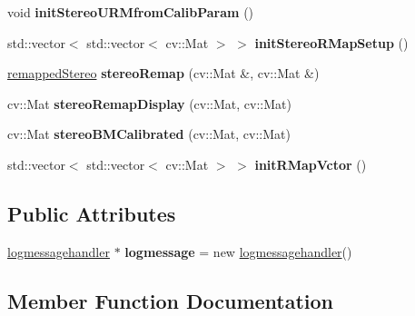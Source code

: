 \begin{DoxyCompactItemize}
void {\bfseries init\+Stereo\+U\+R\+Mfrom\+Calib\+Param} ()
\item 
\mbox{\label{classstereoprocessing_a38583a7eacc99c4dc63aaa48247664c8}} 
std\+::vector$<$ std\+::vector$<$ cv\+::\+Mat $>$ $>$ {\bfseries init\+Stereo\+R\+Map\+Setup} ()
\item 
\mbox{\label{classstereoprocessing_a6900c89409d40826f6b691a91a8e7f7d}} 
\mbox{\hyperlink{structremapped_stereo}{remapped\+Stereo}} {\bfseries stereo\+Remap} (cv\+::\+Mat \&, cv\+::\+Mat \&)
\item 
\mbox{\label{classstereoprocessing_a1c2725216cf6daabd5b122878a638905}} 
cv\+::\+Mat {\bfseries stereo\+Remap\+Display} (cv\+::\+Mat, cv\+::\+Mat)
\item 
\mbox{\label{classstereoprocessing_a3887d170f7bf6c9436e5964594c1d6d2}} 
cv\+::\+Mat {\bfseries stereo\+B\+M\+Calibrated} (cv\+::\+Mat, cv\+::\+Mat)
\item 
\mbox{\label{classstereoprocessing_a237e533db3be8c97714a8a00a7f65d7b}} 
std\+::vector$<$ std\+::vector$<$ cv\+::\+Mat $>$ $>$ {\bfseries init\+R\+Map\+Vctor} ()
\end{DoxyCompactItemize}
\subsection*{Public Attributes}
\begin{DoxyCompactItemize}
\item 
\mbox{\label{classstereoprocessing_a221e8e94b910de024484e554cce0f975}} 
\mbox{\hyperlink{classlogmessagehandler}{logmessagehandler}} $\ast$ {\bfseries logmessage} = new \mbox{\hyperlink{classlogmessagehandler}{logmessagehandler}}()
\end{DoxyCompactItemize}


\subsection{Member Function Documentation}
\mbox{\label{classstereoprocessing_a6d404af62436da57c6e8e8574e203ab8}} 

